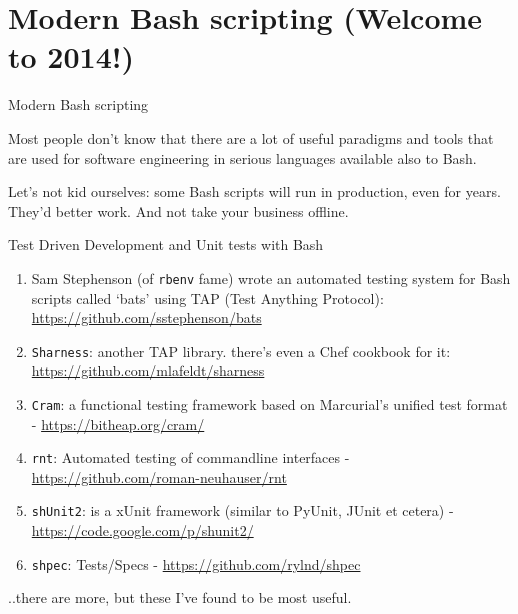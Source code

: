 \section{Modern Bash scripting (Welcome to
2014!)}\label{modern-bash-scripting-welcome-to-2014}

\begin{frame}{Modern Bash scripting}

Most people don't know that there are a lot of useful paradigms and
tools that are used for software engineering in serious languages
available also to Bash.

\vfill
Let's not kid ourselves: some Bash scripts will run in production, even
for years. They'd better work. And not take your business offline.

\end{frame}

\begin{frame}{Test Driven Development and Unit tests with Bash}

\begin{enumerate}
\def\labelenumi{\arabic{enumi}.}
\itemsep1pt\parskip0pt
\item
  Sam Stephenson (of \texttt{rbenv} fame) wrote an automated testing
  system for Bash scripts called `bats' using TAP (Test Anything
  Protocol): \url{https://github.com/sstephenson/bats}
\item
  \texttt{Sharness}: another TAP library. there's even a Chef cookbook
  for it: \url{https://github.com/mlafeldt/sharness}
\item
  \texttt{Cram}: a functional testing framework based on Marcurial's
  unified test format - \url{https://bitheap.org/cram/}
\item
  \texttt{rnt}: Automated testing of commandline interfaces -
  \url{https://github.com/roman-neuhauser/rnt}
\item
  \texttt{shUnit2}: is a xUnit framework (similar to PyUnit, JUnit et
  cetera) - \url{https://code.google.com/p/shunit2/}
\item
  \texttt{shpec}: Tests/Specs - \url{https://github.com/rylnd/shpec}
\end{enumerate}

..there are more, but these I've found to be most useful.

\end{frame}

